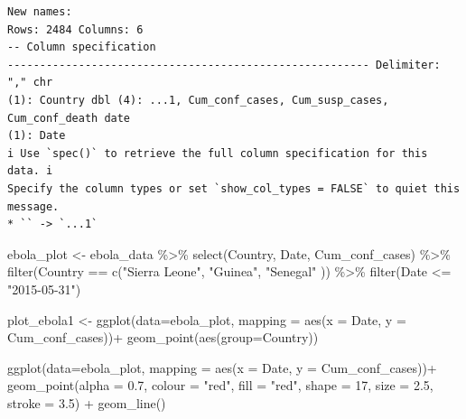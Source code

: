 \documentclass[
  letterpaper,
  DIV=11,
  numbers=noendperiod]{scrartcl}
\newenvironment{Shaded}{\begin{snugshade}}{\end{snugshade}}
\newcommand{\AttributeTok}[1]{\textcolor[rgb]{0.40,0.45,0.13}{#1}}
\newcommand{\DecValTok}[1]{\textcolor[rgb]{0.68,0.00,0.00}{#1}}
\newcommand{\FloatTok}[1]{\textcolor[rgb]{0.68,0.00,0.00}{#1}}
\newcommand{\FunctionTok}[1]{\textcolor[rgb]{0.28,0.35,0.67}{#1}}
\newcommand{\NormalTok}[1]{\textcolor[rgb]{0.00,0.23,0.31}{#1}}
\newcommand{\OtherTok}[1]{\textcolor[rgb]{0.00,0.23,0.31}{#1}}
\newcommand{\SpecialCharTok}[1]{\textcolor[rgb]{0.37,0.37,0.37}{#1}}
\newcommand{\StringTok}[1]{\textcolor[rgb]{0.13,0.47,0.30}{#1}}
\begin{document}
\begin{verbatim}
New names:
Rows: 2484 Columns: 6
-- Column specification
-------------------------------------------------------- Delimiter: "," chr
(1): Country dbl (4): ...1, Cum_conf_cases, Cum_susp_cases, Cum_conf_death date
(1): Date
i Use `spec()` to retrieve the full column specification for this data. i
Specify the column types or set `show_col_types = FALSE` to quiet this message.
* `` -> `...1`
\end{verbatim}

\begin{Shaded}
\begin{Highlighting}[]
\NormalTok{ebola\_plot }\OtherTok{\textless{}{-}}\NormalTok{ ebola\_data }\SpecialCharTok{\%\textgreater{}\%} \FunctionTok{select}\NormalTok{(Country, Date, Cum\_conf\_cases) }\SpecialCharTok{\%\textgreater{}\%}
  \FunctionTok{filter}\NormalTok{(Country }\SpecialCharTok{==} \FunctionTok{c}\NormalTok{(}\StringTok{"Sierra Leone"}\NormalTok{, }\StringTok{"Guinea"}\NormalTok{, }\StringTok{"Senegal"}\NormalTok{ )) }\SpecialCharTok{\%\textgreater{}\%}
  \FunctionTok{filter}\NormalTok{(Date }\SpecialCharTok{\textless{}=} \StringTok{"2015{-}05{-}31"}\NormalTok{)}


\NormalTok{plot\_ebola1 }\OtherTok{\textless{}{-}}
  \FunctionTok{ggplot}\NormalTok{(}\AttributeTok{data=}\NormalTok{ebola\_plot, }\AttributeTok{mapping =} \FunctionTok{aes}\NormalTok{(}\AttributeTok{x =}\NormalTok{ Date, }\AttributeTok{y =}\NormalTok{ Cum\_conf\_cases))}\SpecialCharTok{+}
  \FunctionTok{geom\_point}\NormalTok{(}\FunctionTok{aes}\NormalTok{(}\AttributeTok{group=}\NormalTok{Country))}
  
  \FunctionTok{ggplot}\NormalTok{(}\AttributeTok{data=}\NormalTok{ebola\_plot, }\AttributeTok{mapping =} \FunctionTok{aes}\NormalTok{(}\AttributeTok{x =}\NormalTok{ Date, }\AttributeTok{y =}\NormalTok{ Cum\_conf\_cases))}\SpecialCharTok{+}
    \FunctionTok{geom\_point}\NormalTok{(}\AttributeTok{alpha =} \FloatTok{0.7}\NormalTok{, }\AttributeTok{colour =} \StringTok{"red"}\NormalTok{, }\AttributeTok{fill =} \StringTok{"red"}\NormalTok{, }
               \AttributeTok{shape =} \DecValTok{17}\NormalTok{, }\AttributeTok{size =} \FloatTok{2.5}\NormalTok{, }\AttributeTok{stroke =} \FloatTok{3.5}\NormalTok{) }\SpecialCharTok{+}
    \FunctionTok{geom\_line}\NormalTok{()}
\end{Highlighting}
\end{Shaded}
\end{document}
